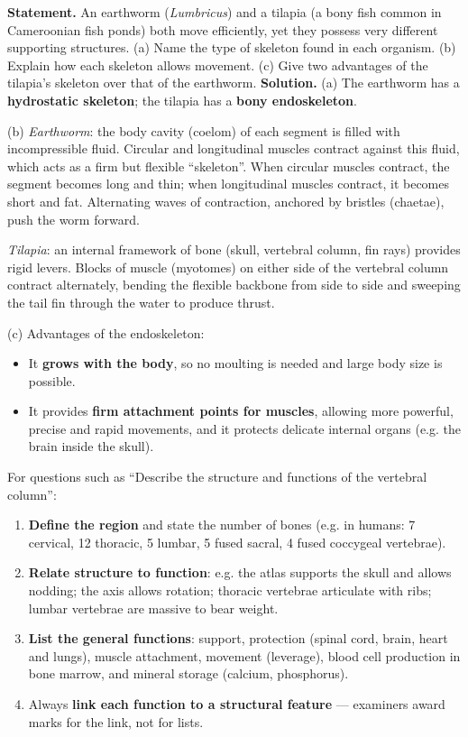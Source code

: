 \documentclass[11pt]{article}
\begin{document}
\begin{exoresolu}
\textbf{Statement.} An earthworm (\emph{Lumbricus}) and a tilapia (a bony fish common in Cameroonian fish ponds) both move efficiently, yet they possess very different supporting structures. (a) Name the type of skeleton found in each organism. (b) Explain how each skeleton allows movement. (c) Give two advantages of the tilapia's skeleton over that of the earthworm.
\tcblower
\textbf{Solution.}
(a) The earthworm has a \textbf{hydrostatic skeleton}; the tilapia has a \textbf{bony endoskeleton}.

(b) \emph{Earthworm}: the body cavity (coelom) of each segment is filled with incompressible fluid. Circular and longitudinal muscles contract against this fluid, which acts as a firm but flexible ``skeleton''. When circular muscles contract, the segment becomes long and thin; when longitudinal muscles contract, it becomes short and fat. Alternating waves of contraction, anchored by bristles (chaetae), push the worm forward.

\emph{Tilapia}: an internal framework of bone (skull, vertebral column, fin rays) provides rigid levers. Blocks of muscle (myotomes) on either side of the vertebral column contract alternately, bending the flexible backbone from side to side and sweeping the tail fin through the water to produce thrust.

(c) Advantages of the endoskeleton:
\begin{itemize}
\item It \textbf{grows with the body}, so no moulting is needed and large body size is possible.
\item It provides \textbf{firm attachment points for muscles}, allowing more powerful, precise and rapid movements, and it protects delicate internal organs (e.g. the brain inside the skull).
\end{itemize}
\end{exoresolu}

\begin{methode}
For questions such as ``Describe the structure and functions of the vertebral column'':
\begin{enumerate}
\item \textbf{Define the region} and state the number of bones (e.g. in humans: 7 cervical, 12 thoracic, 5 lumbar, 5 fused sacral, 4 fused coccygeal vertebrae).
\item \textbf{Relate structure to function}: e.g. the atlas supports the skull and allows nodding; the axis allows rotation; thoracic vertebrae articulate with ribs; lumbar vertebrae are massive to bear weight.
\item \textbf{List the general functions}: support, protection (spinal cord, brain, heart and lungs), muscle attachment, movement (leverage), blood cell production in bone marrow, and mineral storage (calcium, phosphorus).
\item Always \textbf{link each function to a structural feature} --- examiners award marks for the link, not for lists.
\end{enumerate}
\end{methode}
\end{document}
